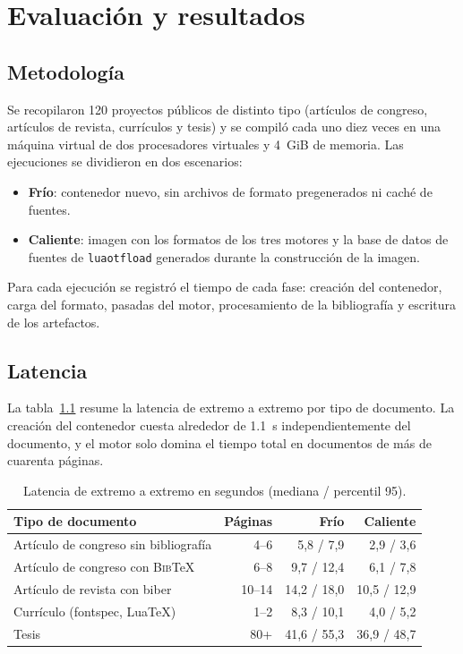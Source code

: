 \chapter{Evaluación y resultados}
\label{cap:resultados}

\section{Metodología}
Se recopilaron 120 proyectos públicos de distinto tipo (artículos de
congreso, artículos de revista, currículos y tesis) y se compiló cada uno
diez veces en una máquina virtual de dos procesadores virtuales y
\SI{4}{GiB} de memoria. Las ejecuciones se dividieron en dos escenarios:

\begin{itemize}
  \item \textbf{Frío}: contenedor nuevo, sin archivos de formato
    pregenerados ni caché de fuentes.
  \item \textbf{Caliente}: imagen con los formatos de los tres motores y la
    base de datos de fuentes de \texttt{luaotfload} generados durante la
    construcción de la imagen.
\end{itemize}

Para cada ejecución se registró el tiempo de cada fase: creación del
contenedor, carga del formato, pasadas del motor, procesamiento de la
bibliografía y escritura de los artefactos.

\section{Latencia}
La tabla~\ref{tab:latencia} resume la latencia de extremo a extremo por tipo
de documento. La creación del contenedor cuesta alrededor de \SI{1,1}{s}
independientemente del documento, y el motor solo domina el tiempo total en
documentos de más de cuarenta páginas.

\begin{table}[htbp]
  \centering
  \caption{Latencia de extremo a extremo en segundos (mediana / percentil 95).}
  \label{tab:latencia}
  \begin{tabular}{@{}lrrr@{}}
    \toprule
    Tipo de documento & Páginas & Frío & Caliente \\
    \midrule
    Artículo de congreso sin bibliografía & 4--6 & 5,8 / 7,9 & 2,9 / 3,6 \\
    Artículo de congreso con \textsc{Bib}\TeX{} & 6--8 & 9,7 / 12,4 & 6,1 / 7,8 \\
    Artículo de revista con biber & 10--14 & 14,2 / 18,0 & 10,5 / 12,9 \\
    Currículo (fontspec, Lua\TeX{}) & 1--2 & 8,3 / 10,1 & 4,0 / 5,2 \\
    Tesis & 80+ & 41,6 / 55,3 & 36,9 / 48,7 \\
    \bottomrule
  \end{tabular}
\end{table}

